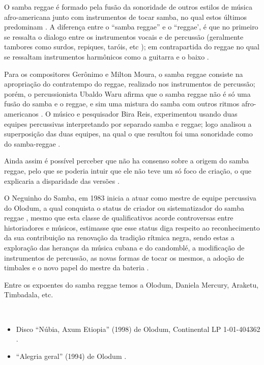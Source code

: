 O samba reggae é formado pela fusão da sonoridade de outros estilos de música 
afro-americana junto com instrumentos de tocar samba, no qual estos últimos predominam \cite[pp. 187]{casa1992anales} \cite[pp. 57]{guerreiro2000trama}.
A diferença entre o ``samba reggae'' e o ``reggae', 
é que no primeiro se ressalta o dialogo entre os instrumentos vocais e de percussão 
(geralmente tambores como surdos, repiques, taróis, etc \cite[pp. 178]{diniz2008almanaque});
em contrapartida do reggae no qual se ressaltam instrumentos harmônicos como a guitarra e o baixo
\cite[pp. 57]{guerreiro2000trama}.

Para os compositores Gerônimo e Milton Moura, o samba reggae consiste na apropriação do contratempo do reggae,
realizado nos instrumentos de percussão;
porém, o percussionista Ubaldo Waru afirma que o samba reggae não é só uma fusão do samba e o reggae,
e sim uma mistura do samba com outros ritmos afro-americanos  \cite[pp. 57]{guerreiro2000trama}.
O músico e pesquisador Bira Reis, experimentou usando duas equipes percussivas 
interpretando por separado samba e reggae; 
logo analisou a superposição das duas equipes, na qual o que resultou foi uma sonoridade como do samba-reggae \cite[pp. 57]{guerreiro2000trama}. 

Ainda assim é possível perceber que não ha consenso sobre a origem do samba reggae,
pelo que se poderia intuir que ele não teve um só foco de criação,
o que explicaria a disparidade das versões  \cite[pp. 58]{guerreiro2000trama}.

O  Neguinho do Samba, 
em 1983 inicia a atuar como mestre de equipe percussiva do Olodum, a qual conquista o
status de criador ou sistematizador do samba reggae \cite[pp. 178]{diniz2008almanaque} \cite[pp. 58-60]{guerreiro2000trama}, 
mesmo que esta classe de qualificativos 
acorde controversas entre historiadores e músicos, estimasse que esse status
diga respeito ao reconhecimento da sua contribuição na renovação da tradição rítmica negra, sendo estas
a exploração das heranças da música cubana e do candomblé,
a modificação de instrumentos de percussão, as novas formas de tocar os mesmos,
a adoção de timbales e
o novo papel do mestre da bateria \cite[pp. 178]{diniz2008almanaque} \cite[pp. 58-60]{guerreiro2000trama}.

Entre os expoentes do samba reggae temos a Olodum, Daniela Mercury, Araketu, Timbadala,  etc.

\begin{example} ~

\begin{itemize}
\item Disco ``Núbia, Axum Etiopia'' (1998) de Olodum, Continental LP 1-01-404362 \cite[pp. 187]{casa1992anales}.
\item ``Alegria geral'' (1994) de Olodum \cite[pp. 207]{dunn2014brutality}.
\end{itemize}
\end{example}



